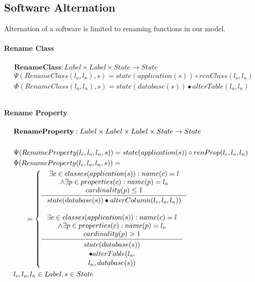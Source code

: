 \documentclass[11pt]{article}
\begin{document}
\subsection{Software Alternation}
Alternation of a software is limited to renaming functions in our model.
\paragraph{Rename Class}
\begin{align*}
& \mathbf{RenameClass} : Label \times Label \times State \rightarrow State \\ 
& \Psi(RenameClass(l_o, l_n), s) = state(application(s)) \circ renClass(l_o, l_n) \\
& \Phi(RenameClass(l_o, l_n), s) = state(database(s)) \bullet alterTable(l_o, l_n) \\ \\
\end{align*}

\paragraph{Rename Property}
\begin{align*}
&	\mathbf{RenameProperty} : Label \times Label \times Label \times State \rightarrow State \\ \\
& \Psi(RenameProperty(l_c, l_o, l_n, s)) = state(application(s)) \circ renProp(l_c, l_o, l_n) \\
& \Phi(RenameProperty(l_c, l_o, l_n, s)) = \\
& \;\;\;\;\;\; =\begin{cases}
 	\inference{\exists c \in classes(application(s)) : name(c) = l\\ 
		\wedge \exists p \in properties(c) : name(p) = l_o \\
 	cardinality(p) \leq 1}{state(database(s)) \bullet alterColumn(l_c, l_o, l_n))} \\\\
 	\inference{\exists c \in classes(application(s)) : name(c) = l\\ 
		\wedge \exists p \in properties(c) : name(p) = l_o \\
 	cardinality(p) > 1}{\begin{gathered}
		state(database(s)) \\ \bullet alterTable(l_o, \\l_n, database(s))
\end{gathered}}
 \end{cases}\\
& l_c, l_o, l_n \in Label,  s \in State
\end{align*}
\end{document}
